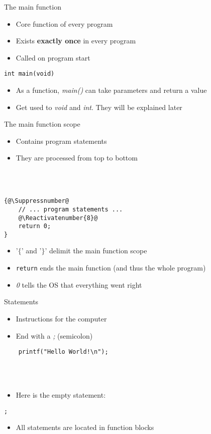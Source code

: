 \begin{frame}[fragile]{The main function}
	\begin{itemize}
		\item Core function of every program
		\item Exists \textbf{exactly once} in every program
		\item Called on program start
	\end{itemize}
	\begin{lstlisting}
int main(void)
\end{lstlisting}
	\begin{itemize}
		\item As a function, \textit{main()} can take parameters and return a value
		\item Get used to \textit{void} and \textit{int}. They will be explained later
	\end{itemize}
\end{frame}
\begin{frame}[fragile]{The main function scope}
	\begin{itemize}
		\item Contains program statements
		\item They are processed from top to bottom
	\end{itemize} \ \\
	\ \\
	\begin{lstlisting}
{@\Suppressnumber@
	// ... program statements ...
	@\Reactivatenumber{8}@
	return 0;
}
\end{lstlisting}
	\begin{itemize}
		\item '$\lbrace$' and '$\rbrace$' delimit the main function scope
		\item \lstinline{return} ends the main function (and thus the whole program)
		\item \textit{0} tells the OS that everything went right
	\end{itemize}
\end{frame}
\begin{frame}[fragile]{Statements}
	\begin{itemize}
		\item Instructions for the computer
		\item End with a \textit{;} (semicolon)
	\end{itemize}
	\begin{lstlisting}
	printf("Hello World!\n");
\end{lstlisting} \ \\ \ \\
	\begin{itemize}
		\item Here is the empty statement:
	\end{itemize}
	\begin{lstlisting}[numbers=none]
	;
\end{lstlisting}
	\begin{itemize}
		\item All statements are located in function blocks
	\end{itemize}
\end{frame}
